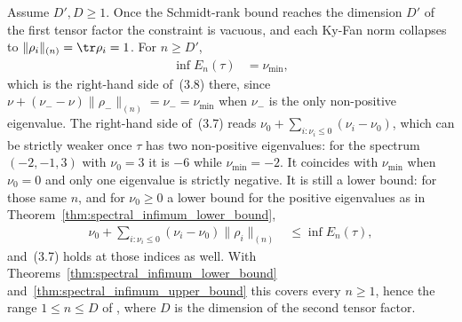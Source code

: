 \begin{theorem}
    \label{thm:spectral_infimum_top}
    \leanok
    Assume $D',D\ge1$. Once the Schmidt-rank bound reaches the dimension $D'$ of
    the first tensor factor the constraint is vacuous, and each Ky-Fan norm
    collapses to
    $\|\rho_i\|_{(n)}=\tr\rho_i=1$. For $n\ge D'$,
    \begin{align}
        \inf E_n(\tau)
         & =\nu_{\min},
        \label{eq:channel_spectral_infimum_top}
    \end{align}
    which is the right-hand side of~(3.8) there, since
    $\nu+(\nu_--\nu)\|\rho_-\|_{(n)}=\nu_-=\nu_{\min}$ when $\nu_-$ is the only
    non-positive eigenvalue. The right-hand side of~(3.7) reads
    $\nu_0+\sum_{i:\nu_i\le0}(\nu_i-\nu_0)$, which can be strictly weaker once
    $\tau$ has two non-positive eigenvalues: for the spectrum $(-2,-1,3)$ with
    $\nu_0=3$ it is $-6$ while $\nu_{\min}=-2$. It coincides with $\nu_{\min}$
    when $\nu_0=0$ and only one eigenvalue is strictly negative. It is still a lower bound: for
    those same $n$, and for $\nu_0\ge0$ a lower bound for the positive
    eigenvalues as in Theorem~\ref{thm:spectral_infimum_lower_bound},
    \begin{align}
        \nu_0+\sum_{i:\nu_i\le0}(\nu_i-\nu_0)\|\rho_i\|_{(n)}
         & \le\inf E_n(\tau),
        \label{eq:channel_spectral_infimum_top_lower}
    \end{align}
    and~(3.7) holds at those indices as well. With
    Theorems~\ref{thm:spectral_infimum_lower_bound}
    and~\ref{thm:spectral_infimum_upper_bound} this covers every $n\ge1$, hence
    the range $1\le n\le D$ of
    \cite[Chapter~3, Proposition~3.1]{Wolf2012Quantum}, where $D$ is the
    dimension of the second tensor factor.
\end{theorem}

